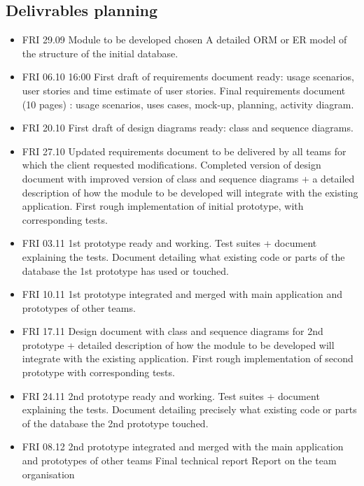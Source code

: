 \documentclass{article}
\begin{document}
\subsection{Delivrables planning}
\begin{itemize}
\item
FRI 29.09
Module to be developed chosen
A detailed ORM or ER model of the structure of the initial database.

\item
FRI 06.10 16:00
First draft of requirements document ready: usage scenarios, user stories and time estimate of user stories.
Final requirements document (10 pages) : usage scenarios, uses cases, mock-up, planning, activity diagram.

\item
FRI 20.10
First draft of design diagrams ready: class and sequence diagrams.

\item
FRI 27.10
Updated requirements document to be delivered by all teams for which the client requested modifications.
Completed version of design document with improved version of class and sequence diagrams + a detailed description of how the module to be developed will integrate with the existing application.
First rough implementation of initial prototype, with corresponding tests.

\item
FRI 03.11
1st prototype ready and working.
Test suites + document explaining the tests.
Document detailing what existing code or parts of the database the 1st prototype has used or touched.

\item
FRI 10.11
1st prototype integrated and merged with main application and prototypes of other teams.

\item
FRI 17.11
Design document with class and sequence diagrams for 2nd prototype + detailed description of how the module to be developed will integrate with the existing application.
First rough implementation of second prototype with corresponding tests.


\item
FRI 24.11
2nd prototype ready and working.
Test suites + document explaining the tests.
Document detailing precisely what existing code or parts of the database the 2nd prototype touched.

\item
FRI 08.12
2nd prototype integrated and merged with the main application and prototypes of other teams
Final technical report
Report on the team organisation


\end{itemize}
\end{document}
